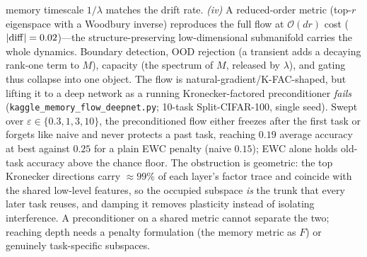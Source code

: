 \documentclass[10pt,a4paper]{article}
\theoremstyle{plain}
\theoremstyle{definition}
\begin{document}
memory timescale $1/\lambda$ matches the drift rate. \emph{(iv)} A reduced-order metric
(top-$r$ eigenspace with a Woodbury inverse) reproduces the full flow at
$\mathcal O(dr)$ cost ($|{\rm diff}|=0.02$)---the structure-preserving low-dimensional
submanifold carries the whole dynamics. Boundary detection, OOD rejection (a transient
adds a decaying rank-one term to $M$), capacity (the spectrum of $M$, released by
$\lambda$), and gating thus collapse into one object. The flow is
natural-gradient/K-FAC-shaped, but lifting it to a deep network as a running
Kronecker-factored preconditioner \emph{fails} (\texttt{kaggle\_memory\_flow\_deepnet.py};
10-task Split-CIFAR-100, single seed). Swept over $\varepsilon\in\{0.3,1,3,10\}$, the
preconditioned flow either freezes after the first task or forgets like naive and never
protects a past task, reaching $0.19$ average accuracy at best against $0.25$ for a plain
EWC penalty (naive $0.15$); EWC alone holds old-task accuracy above the chance floor. The
obstruction is geometric: the top Kronecker directions carry $\approx\!99\%$ of each
layer's factor trace and coincide with the shared low-level features, so the occupied
subspace \emph{is} the trunk that every later task reuses, and damping it removes
plasticity instead of isolating interference. A preconditioner on a shared metric cannot
separate the two; reaching depth needs a penalty formulation (the memory metric as $F$)
or genuinely task-specific subspaces.
\end{document}
